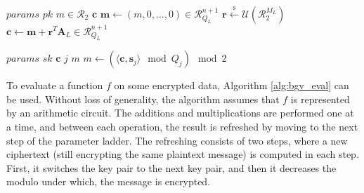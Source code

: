 \renewcommand{\Comment}[2][.5\linewidth]{\leavevmode\hfill\makebox[#1][l]{//~#2}}  %
\begin{algorithm}[ht]
\caption{\;\;$\mathsf{BGV.Enc}$}\label{alg:bgv_enc}
\begin{algorithmic}
\Require
  \State $params$
  \State $pk$
  \State $m \in \mathcal{R}_2$
\Ensure $\mathbf{c}$
  \State $\mathbf{m} \gets (m, 0, ..., 0) \in \mathcal{R}_{Q_L}^{n+1}$
  \State $\mathbf{r} \xleftarrow{\text{s}} \mathcal{U}\left(\mathcal{R}_2^{M_L}\right)$
  \State $\mathbf{c} \gets \mathbf{m} + \mathbf{r}^T \mathbf{A}_L \in \mathcal{R}_{Q_L}^{n+1} $
\end{algorithmic}
\end{algorithm}


\renewcommand{\Comment}[2][.5\linewidth]{\leavevmode\hfill\makebox[#1][l]{//~#2}}  %
\begin{algorithm}[ht]
\caption{\;\;$\mathsf{BGV.Dec}$}\label{alg:bgv_dec}
\begin{algorithmic}
\Require
  \State $params$
  \State $sk$
  \State $\mathbf{c}$
  \State $j$  \Comment{level of $\mathbf{c}$} %
\Ensure $m$
  \State $m \gets (\langle \mathbf{c}, \mathbf{s}_j \rangle \mod Q_j) \mod 2$
\end{algorithmic}
\end{algorithm}

To evaluate a function $f$ on some encrypted data, Algorithm \ref{alg:bgv_eval} can be used. Without loss of generality, the algorithm assumes that $f$ is represented by an arithmetic circuit. The additions and multiplications are performed one at a time, and between each operation, the result is refreshed by moving to the next step of the parameter ladder. The refreshing consists of two steps, where a new ciphertext (still encrypting the same plaintext message) is computed in each step. First, it switches the key pair to the next key pair, and then it decreases the modulo under which, the message is encrypted.


